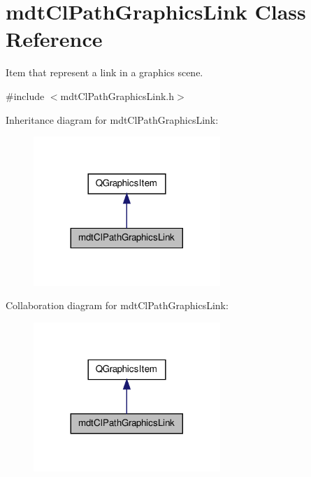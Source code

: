 \hypertarget{classmdt_cl_path_graphics_link}{\section{mdt\-Cl\-Path\-Graphics\-Link Class Reference}
\label{classmdt_cl_path_graphics_link}
}


Item that represent a link in a graphics scene.  




{\ttfamily \#include $<$mdt\-Cl\-Path\-Graphics\-Link.\-h$>$}



Inheritance diagram for mdt\-Cl\-Path\-Graphics\-Link\-:\nopagebreak
\begin{figure}[H]
\begin{center}
\leavevmode
\includegraphics[width=200pt]{classmdt_cl_path_graphics_link__inherit__graph}
\end{center}
\end{figure}


Collaboration diagram for mdt\-Cl\-Path\-Graphics\-Link\-:\nopagebreak
\begin{figure}[H]
\begin{center}
\leavevmode
\includegraphics[width=200pt]{classmdt_cl_path_graphics_link__coll__graph}
\end{center}
\end{figure}
